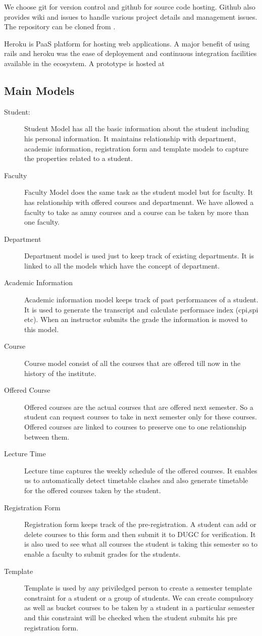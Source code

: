 \documentclass[letterpaper,12pt]{article}
\begin{document}
We choose git for version control and github for source code hosting.
Github also provides wiki and issues to handle various project details
and management issues. The repository can be cloned from \cite{github}.

Heroku is PaaS platform for hosting web applications. A major benefit
of using rails and heroku was the ease of deployement and continuous
integration facilities available in the ecosystem. A prototype is
hosted at \cite{heroku}

 
\subsection{Main Models}
\begin{description}
\item[Student:]
Student Model has all the basic information about the student including his
personal information. It maintains relationship with department, academic
information, registration form and template models to capture the properties
related to a student.
\item[Faculty]
Faculty Model does the same task as the student model but for faculty. It has
relationship with offered courses and departmennt. We have allowed a faculty
to take as amny courses and a course can be taken by more than one faculty.
\item[Department]
Department model is used just to keep track of existing departments. It is
linked to all the models which have the concept of department.
\item[Academic Information]
Academic information model keeps track of past performances of a student. It
is used to generate the transcript and calculate performace index (cpi,spi
etc). When an instructor submits the grade the information is moved to this
model.
\item[Course]
Course model consist of all the courses that are offered till now in the
history of the institute.
\item[Offered Course]
Offered courses are the actual courses that are offered next semester. So a
student can request courses to take in next semester only for these
courses. Offered courses are linked to courses to preserve one to one
relationship between them.
\item[Lecture Time]
Lecture time captures the weekly schedule of the offered courses. It enables
us to automatically detect timetable clashes and also generate timetable
for the offered courses taken by the student.
\item[Registration Form]
Registration form keeps track of the pre-registration. A student can add or
delete courses to this form and then submit it to DUGC for verification. It is
also used to see what all courses the student is taking this semester so to
enable a faculty to submit grades for the students.
\item[Template]
Template is used by any priviledged person to create a semester template
constraint for a student or a group of students. We can create compulsory as
well as bucket courses to be taken by a student in a particular semester and
this constraint will be checked when the student submits his pre registration
form.
\end{description}
\end{document}
